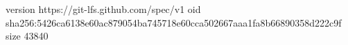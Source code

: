 version https://git-lfs.github.com/spec/v1
oid sha256:5426ca6138e60ac879054ba745718e60cca502667aaa1fa8b66890358d222c9f
size 43840
